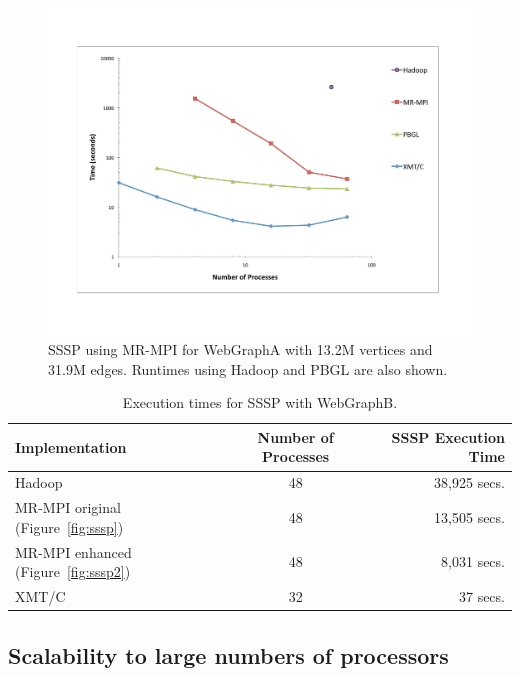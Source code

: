 \begin{figure}[htb]
\includegraphics[width=\textwidth]{fig_ssspA.pdf}
\caption{SSSP using MR-MPI for WebGraphA with
13.2M vertices and 31.9M edges.  Runtimes using Hadoop and PBGL
are also shown.}
\label{f:ssspA}
\end{figure}

\begin{table}
\begin{center}
\begin{tabular}{|l|c|r|}
\hline
Implementation & Number of Processes & SSSP Execution Time \\
\hline
Hadoop & 48  & 38,925 secs.\\
MR-MPI original (Figure~\ref{fig:sssp}) & 48 &  13,505 secs.\\
MR-MPI enhanced (Figure~\ref{fig:sssp2}) & 48 &  8,031 secs.\\
XMT/C  & 32 &  37 secs.\\
\hline
\end{tabular}
\caption{Execution times for SSSP with {WebGraphB}.}
\label{t:ssspB}
\end{center}
\end{table}

\subsection{Scalability to large numbers of processors}

